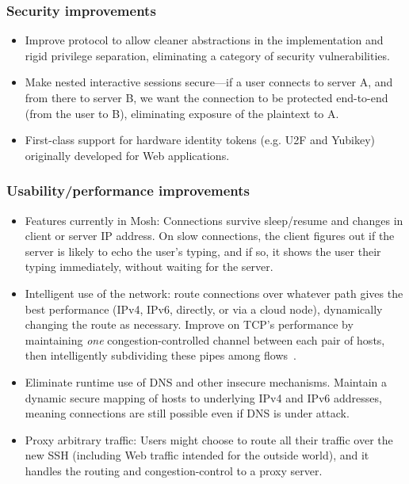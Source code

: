 \documentclass[10pt]{article}
\begin{document}
\subsubsection{Security improvements}
%
\begin{itemize}[topsep=0pt, itemsep=0pt]

\item Improve protocol to allow cleaner abstractions in the
  implementation and rigid privilege separation, eliminating a
  category of security vulnerabilities.

\item Make nested interactive sessions secure---if a user connects to
  server A, and from there to server B, we want the connection to be
  protected end-to-end (from the user to B), eliminating exposure
  of the plaintext to A.

\item First-class support for hardware identity tokens (e.g. U2F and
  Yubikey) originally developed for Web applications.

\end{itemize}

\subsubsection{Usability/performance improvements}
%
\begin{itemize}[topsep=0pt, itemsep=0pt]

\item Features currently in Mosh: Connections survive sleep/resume and
  changes in client or server IP address. On slow connections, the
  client figures out if the server is likely to echo the user's
  typing, and if so, it shows the user their typing immediately,
  without waiting for the server.

\item Intelligent use of the network: route connections over whatever
  path gives the best performance (IPv4, IPv6, directly, or via a
  cloud node), dynamically changing the route as necessary. Improve
  on TCP's performance by maintaining \emph{one} congestion-controlled
  channel between each pair of hosts, then intelligently subdividing
  these pipes among flows~\cite{congmgr, ron}.

\item Eliminate runtime use of DNS and other insecure
  mechanisms. Maintain a dynamic secure mapping of hosts to underlying
  IPv4 and IPv6 addresses, meaning connections are still possible even
  if DNS is under attack.

\item Proxy arbitrary traffic: Users might choose to route all their
  traffic over the new SSH (including Web traffic intended for the
  outside world), and it handles the routing and congestion-control to
  a proxy server.

\end{itemize}
\end{document}
